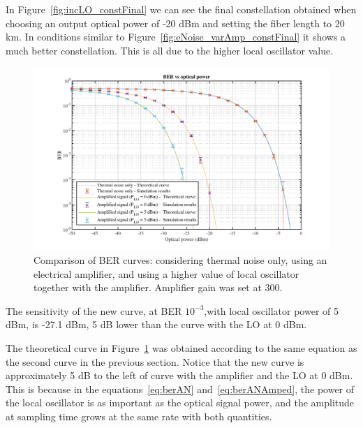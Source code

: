 In Figure~\ref{fig:incLO_constFinal} we can see the final constellation 
obtained when choosing an output optical power of -20 dBm and setting the fiber 
length to 20 km. In conditions similar to 
Figure~\ref{fig:eNoise_varAmp_constFinal} it shows a much better constellation. 
This is all due to the higher local oscillator value.



	\begin{figure}[H]
	\centering
	\includegraphics[width=1\textwidth]
	{sdf/m_qam_system/figures/simulations/04_incLO/berComp.pdf}
	\caption{Comparison of BER curves: considering thermal noise only, using an 
	electrical amplifier, and using a higher value of local 
	oscillator together with the amplifier. Amplifier gain was set at 
	300.}\label{fig:sim_incLO_ber12dBm}
\end{figure}

The sensitivity of the new curve, at BER $10^{-3}$,with local oscillator power 
of 5 dBm, is -27.1 dBm, 5 dB lower than the curve with the LO at 0 dBm.

The theoretical curve in Figure~\ref{fig:sim_incLO_ber12dBm} was obtained 
according to the same equation as the second curve in the previous section. 
Notice that the new curve is approximately 5 dB to the left of curve with the 
amplifier and the LO at 0 dBm. This is because in the 
equations~\ref{eq:berAN} and~\ref{eq:berANAmped}, the power of the local 
oscillator is as important as the optical signal power, and the amplitude at 
sampling time grows at the same rate with both quantities.

